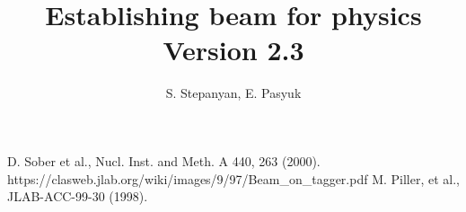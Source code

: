 \documentclass[12pt]{article}
\newcommand{\versionnumber}{2.3}
\begin{document}
\title{Establishing beam for physics \\\normalsize Version \versionnumber}
\author{S. Stepanyan, E. Pasyuk}
\maketitle


\begin{thebibliography}{00}
 D. Sober et al., Nucl. Inst. and Meth. A 440, 263 (2000).
 https://clasweb.jlab.org/wiki/images/9/97/Beam\_on\_tagger.pdf
 M. Piller, et al., JLAB-ACC-99-30 (1998).
\end{thebibliography}
\end{document}
